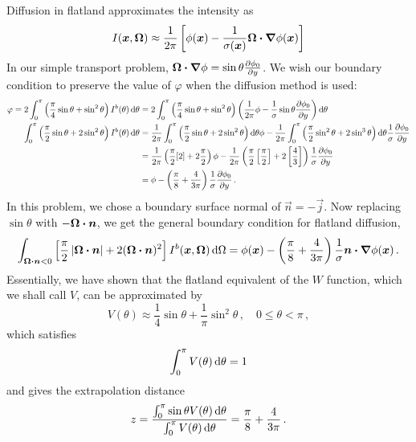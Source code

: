 Diffusion in flatland approximates the intensity as 
\begin{equation*}
  I(\bm{x}, \bm{\Omega}) \approx \frac{1}{2\pi} \left[ \phi(\bm{x}) -
  \frac{1}{\sigma(\bm{x})} \bm{\Omega}
\bm{\cdot} \bm{\nabla} \phi(\bm{x}) \right]
\end{equation*}
In our simple transport problem, $\bm{\Omega} \bm{\cdot} \bm{\nabla} \phi=\sin\theta
\frac{\partial \phi_0}{\partial y}$. We wish our boundary condition to preserve the value of
$\varphi$ when the diffusion method is used:
\begin{align*}
 \varphi = 2\int_{0}^{\pi} \left( \frac{\pi}{4} \sin\theta + \sin^2\theta \right)
 I^b(\theta) \mathop{}\!\mathrm{d}\theta
 &= 
  2\int_{0}^{\pi} \left( \frac{\pi}{4} \sin\theta + \sin^2\theta \right)
 \left( \frac{1}{2\pi} \phi -
  \frac{1}{\sigma} \sin\theta \frac{\partial \phi_0}{\partial y}\right)\mathop{}\!\mathrm{d}\theta
\\
\int_{0}^{\pi} \left( \frac{\pi}{2} \sin\theta + 2 \sin^2\theta \right)
 I^b(\theta) \mathop{}\!\mathrm{d}\theta
 &= 
\frac{1}{2\pi} \int_{0}^{\pi} \left( \frac{\pi}{2} \sin\theta + 2 \sin^2\theta
\right)\mathop{}\!\mathrm{d}\theta
 \phi -
 \frac{1}{2\pi} \int_{0}^{\pi} \left( \frac{\pi}{2} \sin^2\theta + 2 \sin^3\theta \right)\mathop{}\!\mathrm{d}\theta \frac{1}{\sigma} \frac{\partial \phi_0}{\partial y}
  \\
 &= 
 \frac{1}{2\pi} \left( \frac{\pi}{2} [2] + 2 \frac{\pi}{2}
\right) \phi
-
\frac{1}{2\pi} \left( \frac{\pi}{2} \left[ \frac{\pi}{2} \right] + 2 \left[
\frac{4}{3} \right] \right) \frac{1}{\sigma} \frac{\partial \phi_0}{\partial y}
\\
 &= 
  \phi
- \left( \frac{\pi}{8} + \frac{4}{3\pi} \right) \frac{1}{\sigma} \frac{\partial \phi_0}{\partial y}
\,.
\end{align*}
In this problem, we chose a boundary surface normal of $\vec{n}=-\vec{j}$. Now
replacing $\sin \theta$ with $-\bm{\Omega}\bm{\cdot}\bm{n}$, we get the general
boundary condition for flatland diffusion,
\begin{equation} \label{eq:flatlandDiffusionVarBc}
\int_{\bm{\Omega}\bm{\cdot}\bm{n} < 0} \left[ \frac{\pi}{2}
\left| \bm{\Omega}\bm{\cdot}\bm{n} \right| + 2 (\bm{\Omega}\bm{\cdot}\bm{n})^2 \right]
I^b(\bm{x}, \bm{\Omega}) \mathop{}\!\mathrm{d}\Omega
= 
  \phi(\bm{x})
  - \left( \frac{\pi}{8} + \frac{4}{3\pi} \right) \frac{1}{\sigma}
  \bm{n}\bm{\cdot}\bm{\nabla} \phi(\bm{x})\,.
\end{equation}
Essentially, we have shown that the flatland equivalent of the $W$ function,
which we shall call $V$, can be approximated by
\begin{equation}\label{eq:flatlandVariational}
  V(\theta)
  \approx \frac{1}{4}\sin\theta + \frac{1}{\pi} \sin^2\theta \,,\quad
  0 \le \theta < \pi \,,
\end{equation}
which satisfies
\begin{equation*}
  \int_{0}^{\pi} V(\theta) \mathop{}\!\mathrm{d}\theta= 1
\end{equation*}
and gives the extrapolation distance
\begin{equation*}
  z = \frac{\int_{0}^{\pi} \sin \theta V(\theta) \mathop{}\!\mathrm{d}\theta}{\int_{0}^{\pi}
  V(\theta) \mathop{}\!\mathrm{d}\theta} =  \frac{\pi}{8} + \frac{4}{3\pi} \,.
\end{equation*}


